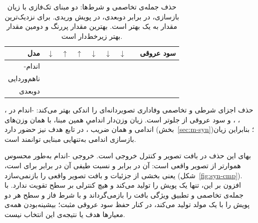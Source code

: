 \begin{table}[H]
\centering
\scriptsize
\setlength{\tabcolsep}{2.5pt}
\caption[حذف جمله‌ی تخاصمی و شرط‌ها]{حذف جمله‌ی تخاصمی و شرط‌ها: دو مبنای تک‌فازی با زیان بازسازی، در برابر  دوبعدی، در پویش وریدی. برای  نزدیک‌ترین مقدار به یک بهتر است. بهترین مقدار پررنگ و دومین مقدار بهتر زیرخط‌دار است.}
\label{tab:syn-l1baselines}
\begin{tabular}{|r|r|r|r|r|r|r|r|R{1.6cm}|}
\hline
\textbf{مدل} & $\downarrow$ & $\uparrow$ & $\uparrow$ & $\downarrow$ & $\downarrow$ & $\downarrow$ &  & \textbf{سود عروقی} \\
\hline
{}-اندام & \textbf{} & \underline{} & \textbf{} & \textbf{} & \underline{} & \underline{} & \underline{} & \textbf{} \\
\hline
{} ناهم‌وردایی & \underline{} & \textbf{} & \textbf{} & \underline{} &  &  &  &  \\
\hline
{} دوبعدی &  &  &  &  & \textbf{} & \textbf{} & \textbf{} & \underline{} \\
\hline
\end{tabular}
\end{table}

حذف اجزای شرطی و تخاصمی وفاداری تصویردانه‌ای را اندکی بهتر می‌کند: -اندام در ، ، ،  و سود عروقی از  جلوتر است. زیان  وزن‌دار اندامیِ همین مبنا، با همان وزن‌های اندامی و همان ضریب ، در تابع هدف  نیز حضور دارد (بخش~\ref{sec:m-syn})؛ بنابراین زیان بازسازی اندامی به‌تنهایی مبنایی توانمند است.

بهای این حذف در بافت تصویر و کنترل خروجی است. خروجی -اندام به‌طور محسوس هموارتر از تصویر واقعی است:  آن  در برابر  و نسبت طیفی آن  در برابر  برای  است، یعنی بخشی از جزئیات و بافت تصویر واقعی را بازنمی‌سازد (شکل~\ref{fig:syn-cmp}). افزون بر این، تنها یک پویش را تولید می‌کند و هیچ کنترلی بر سطح تقویت ندارد.  با جمله‌ی تخاصمی و تطبیق ویژگی بافت را بازمی‌گرداند و با شرط فاز و سطح هر دو پویش را با یک مولد تولید می‌کند، در کنار حفظ سود عروقی مثبت؛ بیشینه‌بودن همه‌ی معیارها هدف یا نتیجه‌ی این انتخاب نیست.

